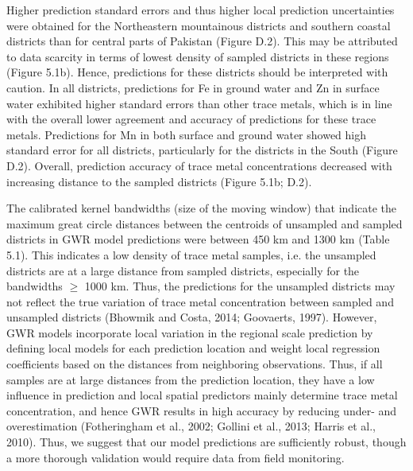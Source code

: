 Higher prediction standard errors and thus higher local prediction uncertainties were obtained for the Northeastern mountainous districts and southern coastal districts than for central parts of Pakistan (Figure D.2). This may be attributed to data scarcity in terms of lowest density of sampled districts in these regions (Figure 5.1b). Hence, predictions for these districts should be interpreted with caution. In all districts, predictions for Fe in ground water and Zn in surface water exhibited higher standard errors than other trace metals, which is in line with the overall lower agreement and accuracy of predictions for these trace metals. Predictions for Mn in both surface and ground water showed high standard error for all districts, particularly for the districts in the South (Figure D.2). Overall, prediction accuracy of trace metal concentrations decreased with increasing distance to the sampled districts (Figure 5.1b; D.2).

The calibrated kernel bandwidths (size of the moving window) that indicate the maximum great circle distances between the centroids of unsampled and sampled districts in GWR model predictions were between 450 km and 1300 km (Table 5.1). This indicates a low density of trace metal samples, i.e. the unsampled districts are at a large distance from sampled districts, especially for the bandwidths $\geq$ 1000 km. Thus, the predictions for the unsampled districts may not reflect the true variation of trace metal concentration between sampled and unsampled districts (Bhowmik and Costa, 2014; Goovaerts, 1997). However, GWR models incorporate local variation in the regional scale prediction by defining local models for each prediction location and weight local regression coefficients based on the distances from neighboring observations. Thus, if all samples are at large distances from the prediction location, they have a low influence in prediction and local spatial predictors mainly determine trace metal concentration, and hence GWR results in high accuracy by reducing under- and overestimation (Fotheringham et al., 2002; Gollini et al., 2013; Harris et al., 2010). Thus, we suggest that our model predictions are sufficiently robust, though a more thorough validation would require data from field monitoring.

